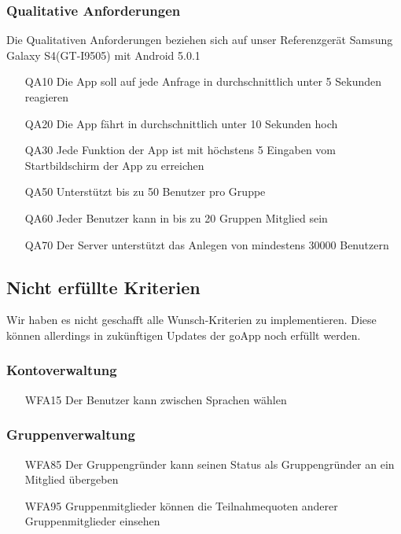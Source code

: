 \documentclass{scrartcl}
\begin{document}
		
	\subsubsection{Qualitative Anforderungen}
	Die Qualitativen Anforderungen beziehen sich auf unser Referenzgerät
	\glqq Samsung Galaxy S4\grqq  (GT-I9505) mit Android 5.0.1
	\begin{itemize}
		\item[QA10] Die App soll auf jede Anfrage in durchschnittlich unter 5 Sekunden reagieren
		\item[QA20] Die App fährt in durchschnittlich unter 10 Sekunden hoch
		\item[QA30] Jede Funktion der App ist mit höchstens 5 Eingaben vom Startbildschirm der App zu erreichen
		\item[QA50] Unterstützt bis zu 50 Benutzer pro Gruppe
		\item[QA60] Jeder Benutzer kann in bis zu 20 Gruppen Mitglied sein
		\item[QA70] Der Server unterstützt das Anlegen von mindestens 30000 Benutzern
	\end{itemize}
	
	\newpage
	\subsection{Nicht erfüllte Kriterien}
	Wir haben es nicht geschafft alle Wunsch-Kriterien zu implementieren. Diese können allerdings in zukünftigen Updates der goApp noch erfüllt werden.
		\subsubsection{Kontoverwaltung}
		\begin{itemize}
			\item[WFA15] Der Benutzer kann zwischen Sprachen wählen
		\end{itemize}
		
		\subsubsection{Gruppenverwaltung}
		\begin{itemize}
			\item[WFA85] Der Gruppengründer kann seinen Status als Gruppengründer an ein Mitglied übergeben
			\item[WFA95] Gruppenmitglieder können die Teilnahmequoten anderer Gruppenmitglieder einsehen
		\end{itemize}
\end{document}
